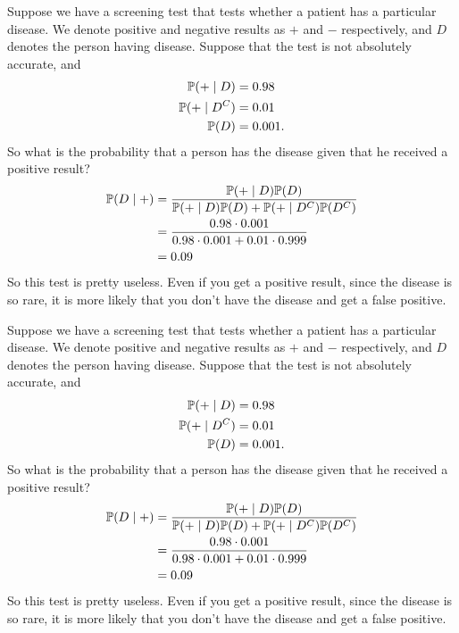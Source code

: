 \begin{note}
  \begin{field}
    \begin{eg}
      Suppose we have a screening test that tests whether a patient has a particular disease. We denote positive and negative results as $+$ and $-$ respectively, and $D$ denotes the person having disease. Suppose that the test is not absolutely accurate, and
      \begin{align*}
        \P(+ \mid D) &= 0.98\\
        \P(+ \mid D^C) &= 0.01\\
        \P(D) &= 0.001.
      \end{align*}
      So what is the probability that a person has the disease given that he received a positive result?
      \begin{align*}
        \P(D\mid +) &= \frac{\P(+ \mid D)\P(D)}{\P(+\mid D)\P(D) + \P(+\mid D^C)\P(D^C)}\\
        &= \frac{0.98\cdot 0.001}{0.98\cdot 0.001 + 0.01\cdot 0.999}\\
        &= 0.09
      \end{align*}
      So this test is pretty useless. Even if you get a positive result, since the disease is so rare, it is more likely that you don't have the disease and get a false positive.
    \end{eg}
  \end{field}
  \begin{field}
    \begin{eg}
      Suppose we have a screening test that tests whether a patient has a particular disease. We denote positive and negative results as $+$ and $-$ respectively, and $D$ denotes the person having disease. Suppose that the test is not absolutely accurate, and
      \begin{align*}
        \P(+ \mid D) &= 0.98\\
        \P(+ \mid D^C) &= 0.01\\
        \P(D) &= 0.001.
      \end{align*}
      So what is the probability that a person has the disease given that he received a positive result?
      \begin{align*}
        \P(D\mid +) &= \frac{\P(+ \mid D)\P(D)}{\P(+\mid D)\P(D) + \P(+\mid D^C)\P(D^C)}\\
        &= \frac{0.98\cdot 0.001}{0.98\cdot 0.001 + 0.01\cdot 0.999}\\
        &= 0.09
      \end{align*}
      So this test is pretty useless. Even if you get a positive result, since the disease is so rare, it is more likely that you don't have the disease and get a false positive.
    \end{eg}
  \end{field}
  \xplain{}%
\end{note}

